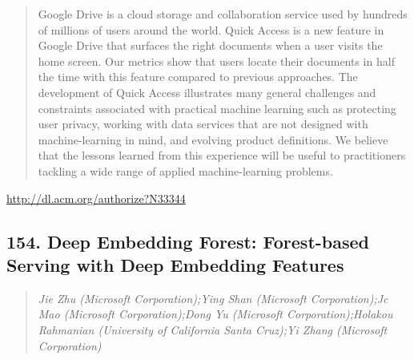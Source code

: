 \documentclass{article}
\begin{document}
\begin{quote}
Google Drive is a cloud storage and collaboration service used by hundreds of millions of users around the world. Quick Access is a new feature in Google Drive that surfaces the right documents when a user visits the home screen. Our metrics show that users locate their documents in half the time with this feature compared to previous approaches. The development of Quick Access illustrates many general challenges and constraints associated with practical machine learning such as protecting user privacy, working with data services that are not designed with machine-learning in mind, and evolving product definitions. We believe that the lessons learned from this experience will be useful to practitioners tackling a wide range of applied machine-learning problems.
\end{quote}

\href{http://dl.acm.org/authorize?N33344}{http://dl.acm.org/authorize?N33344}

\subsection{154. Deep Embedding Forest: Forest-based Serving with Deep Embedding Features}

\begin{quote}
\footnotesize{\textit{Jie Zhu (Microsoft Corporation);Ying Shan (Microsoft Corporation);Jc Mao (Microsoft Corporation);Dong Yu (Microsoft Corporation);Holakou Rahmanian (University of California Santa Cruz);Yi Zhang (Microsoft Corporation)}}

\end{quote}
\end{document}
